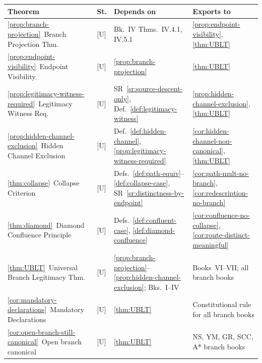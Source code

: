 \documentclass[12pt,oneside]{amsbook}
\theoremstyle{plain}
\theoremstyle{definition}
\theoremstyle{remark}
\begin{document}
\renewcommand{\arraystretch}{1.4}
\noindent
\begin{tabular}{@{}p{4.2cm}p{0.8cm}p{3.4cm}p{4.6cm}@{}}
\hline
\textbf{Theorem} & \textbf{St.} & \textbf{Depends on} & \textbf{Exports to} \\
\hline
\ref{prop:branch-projection}\ Branch Projection Thm.
  & [U] & Bk.~IV Thms.~IV.4.1, IV.5.1
  & \ref{prop:endpoint-visibility}, \ref{thm:UBLT} \\

\ref{prop:endpoint-visibility}\ Endpoint Visibility
  & [U] & \ref{prop:branch-projection}
  & \ref{thm:UBLT} \\

\ref{prop:legitimacy-witness-required}\ Legitimacy Witness Req.
  & [U] & SR~\ref{sr:source-descent-only},
    Def.~\ref{def:legitimacy-witness}
  & \ref{prop:hidden-channel-exclusion}, \ref{thm:UBLT} \\

\ref{prop:hidden-channel-exclusion}\ Hidden Channel Exclusion
  & [U] & Def.~\ref{def:hidden-channel},
    \ref{prop:legitimacy-witness-required}
  & \ref{cor:hidden-channel-non-canonical}, \ref{thm:UBLT} \\

\ref{thm:collapse}\ Collapse Criterion
  & [U] & Defs.~\ref{def:path-equiv}--\ref{def:collapse-case},
    SR~\ref{sr:distinctness-by-endpoint}
  & \ref{cor:path-mult-no-branch}, \ref{cor:redescription-no-branch} \\

\ref{thm:diamond}\ Diamond Confluence Principle
  & [U] & Defs.~\ref{def:confluent-case}, \ref{def:diamond-confluence}
  & \ref{cor:confluence-no-collapse}, \ref{cor:route-distinct-meaningful} \\

\ref{thm:UBLT}\ Universal Branch Legitimacy Thm.
  & [U] & \ref{prop:branch-projection}--\ref{prop:hidden-channel-exclusion};
    Bks.~I--IV
  & Books~VI--VII; all branch books \\

\ref{cor:mandatory-declarations}\ Mandatory Declarations
  & [U] & \ref{thm:UBLT}
  & Constitutional rule for all branch books \\

\ref{cor:open-branch-still-canonical}\ Open branch canonical
  & [U] & \ref{thm:UBLT}
  & NS, YM, GR, SCC, A* branch books \\
\hline
\end{tabular}
\renewcommand{\arraystretch}{1}
\end{document}
